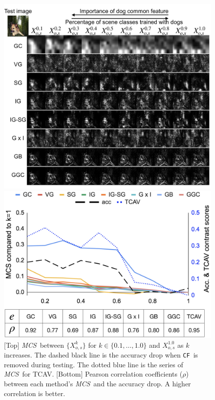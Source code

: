 \documentclass[twoside]{article}
\newcommand{\CF}{\texttt{CF}}
\newcommand{\MCS}{\textit{MCS}}
\begin{document}
\begin{figure}[ht]
\centering
\begin{minipage}{.48\textwidth}
  \centering
  \includegraphics[width=1.\linewidth]{figures/rmc_demo.jpg}
  \caption{An example of saliency map visualizations for models trained with \CF s of different $k$. $k$ increases from left to right. A larger contrast among each row is better. (Full size figure in Appendix.) }
  \label{fig:rmc_demo}
\end{minipage}
  \hfill
\begin{minipage}{.48\textwidth}
  \centering
  \includegraphics[width=1.\linewidth]{figures/rmc_chart.jpg}
  \caption{[Top] \MCS~between $\{X_{o,s}^k\}$ for $k \in \{0.1, \dots, 1.0\}$ and $X_{o,s}^{1.0}$ as $k$ increases. The dashed black line is the accuracy drop when \CF~is removed during testing. The dotted blue line is the series of \MCS~for TCAV. [Bottom] Pearson correlation coefficients ($\rho$) between each method's \MCS~and the accuracy drop. A higher correlation is better.}
  \label{fig:rmc_bar}
\end{minipage}
\end{figure}
\end{document}
